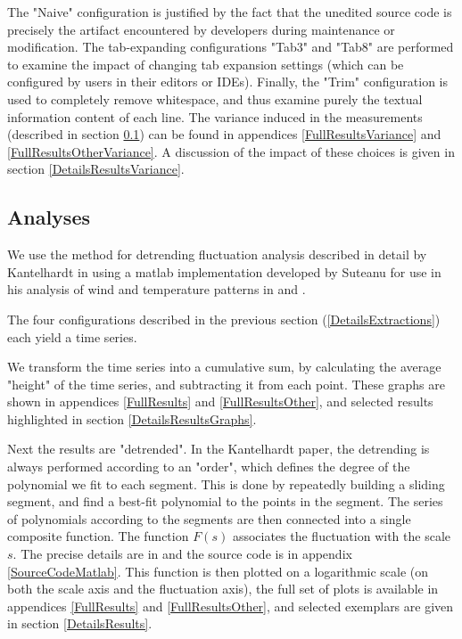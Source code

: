 \documentclass[12pt]{article}
\begin{document}
The "Naive" configuration is justified by the fact that the unedited source code is precisely the artifact encountered by developers during maintenance or modification.  The tab-expanding configurations "Tab3" and "Tab8" are performed to examine the impact of changing tab expansion settings (which can be configured by users in their editors or IDEs).  Finally, the "Trim" configuration is used to completely remove whitespace, and thus examine purely the textual information content of each line.  The variance induced in the measurements (described in section \ref{DetailsAnalyses}) can be found in appendices \ref{FullResultsVariance} and \ref{FullResultsOtherVariance}.  A discussion of the impact of these choices is given in section \ref{DetailsResultsVariance}.


\subsection{Analyses}\label{DetailsAnalyses}


We use the method for detrending fluctuation analysis described in detail by Kantelhardt in \cite{Kantelhardt:DFA:01} using a matlab implementation developed by Suteanu for use in his analysis of wind and temperature patterns in \cite{Suteanu:AirTemps:14} and \cite{Suteanu:ArticWind:14}. 

The four configurations described in the previous section (\ref{DetailsExtractions}) each yield a time series.  

We transform the time series into a cumulative sum, by calculating the average "height" of the time series, and subtracting it from each point.  These graphs are shown in appendices \ref{FullResults} and \ref{FullResultsOther}, and selected results highlighted in section \ref{DetailsResultsGraphs}.  

Next the results are "detrended".  In the Kantelhardt paper, the detrending is always performed according to an "order", which defines the degree of the polynomial we fit to each segment.  This is done by repeatedly building a sliding segment, and find a best-fit polynomial to the points in the segment.  The series of polynomials according to the segments are then connected into a single composite function.  The function $F(s)$ associates the fluctuation with the scale $s$.  The precise details are in \cite{Kantelhardt:DFA:01} and the source code is in appendix \ref{SourceCodeMatlab}.  This function is then plotted on a logarithmic scale (on both the scale axis and the fluctuation axis), the full set of plots is available in appendices \ref{FullResults} and \ref{FullResultsOther}, and selected exemplars are given in section \ref{DetailsResults}.
\end{document}
